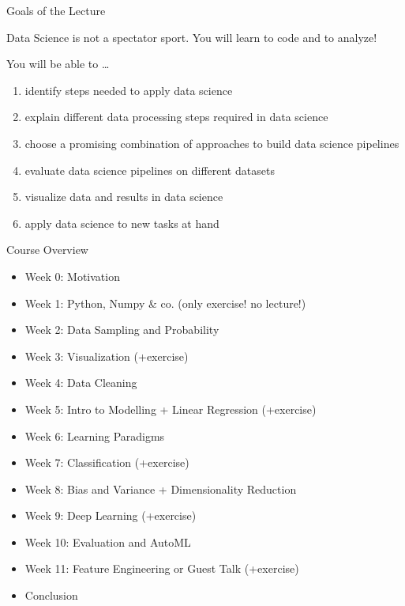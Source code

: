 \documentclass[aspectratio=169,handout]{../latex_main/tntbeamer}  %
\begin{document}
\begin{frame}[c]{Goals of the Lecture}

Data Science is not a spectator sport.
You will learn to code and to analyze!

You will be able to \ldots
\begin{enumerate}
  \item \alert{identify} steps needed to apply data science
  \pause
  \item \alert{explain} different data processing steps required in data science
  \pause
  \item \alert{choose} a promising combination of approaches to build data science pipelines
  \pause
  \item \alert{evaluate} data science pipelines on different datasets
  \pause
  \item \alert{visualize} data and results in data science
  \pause
  \item \alert{apply} data science to new tasks at hand
\end{enumerate}

\end{frame}
\begin{frame}[c]{Course Overview}

\vspace*{-1em}
\begin{itemize} 
    \item Week 0: Motivation
	\item Week 1: Python, Numpy \& co. (\alert{only exercise! no lecture!})
        \item Week 2: Data Sampling and Probability 
        \item Week 3: Visualization (+exercise)
        \item Week 4: Data Cleaning 
	\pause
	\item Week 5: Intro to Modelling + Linear Regression (+exercise)
	\item Week 6: Learning Paradigms
	\item Week 7: Classification (+exercise)
        \item Week 8: Bias and Variance + Dimensionality Reduction 
        \pause
        \item Week 9: Deep Learning (+exercise)
        \item Week 10: Evaluation and AutoML 
        \item Week 11: Feature Engineering or Guest Talk (+exercise)
	\pause
	\item Conclusion 
\end{itemize}



\end{frame}
\end{document}
